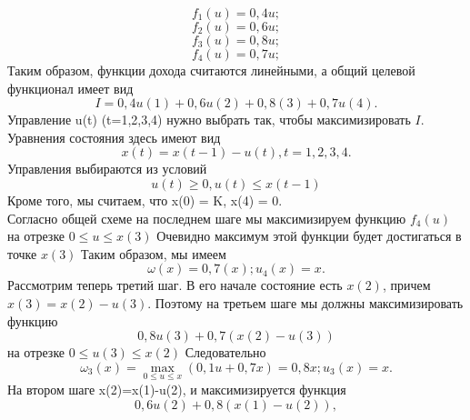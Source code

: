  \begin{equation*}
f_1(u) = 0,4u;
\end{equation*}
 \begin{equation*}
f_2(u) = 0,6u;
\end{equation*}
 \begin{equation*}
f_3(u) = 0,8u;
\end{equation*}
 \begin{equation*}
f_4(u) = 0,7u;
\end{equation*}
\indent Таким образом, функции дохода считаются линейными, а общий целевой функционал имеет вид
 \begin{equation*}
I = 0,4u(1)+0,6u(2)+0,8(3)+0,7u(4).
\end{equation*}
\indent Управление u(t) (t=1,2,3,4) нужно выбрать так, чтобы максимизировать $I$. Уравнения состояния здесь имеют вид
 \begin{equation*}
x(t) = x(t-1)-u(t), t = 1,2,3,4.
\end{equation*}
\indent Управления выбираются из условий
 \begin{equation*}
u(t) \ge 0, u(t) \le x(t-1)
\end{equation*}
\indent Кроме того, мы считаем, что  x(0) = K, x(4) = 0.
\\\indent Согласно общей схеме на последнем шаге мы максимизируем функцию $f_4(u)$ на отрезке $0\le u\le x(3)$ Очевидно максимум этой функции будет достигаться в точке $x(3)$ Таким образом, мы имеем
 \begin{equation*}
\omega(x) = 0,7(x); u_4(x) = x.
\end{equation*}
\indent Рассмотрим теперь третий шаг. В его начале состояние есть $x(2)$, причем $x(3)=x(2)-u(3)$. Поэтому на третьем шаге мы должны максимизировать функцию
 \begin{equation*}
0,8u(3)+0,7(x(2)-u(3))
\end{equation*}
на отрезке $0 \le u(3) \le x(2)$ Следовательно
 \begin{equation*}
\omega_3(x) = \max_{0 \le u \le x}(0,1u+0,7x)=0,8x;u_3(x)=x.
\end{equation*}
\indent На втором шаге x(2)=x(1)-u(2), и максимизируется функция
 \begin{equation*}
0,6u(2)+0,8(x(1)-u(2)),
\end{equation*}

